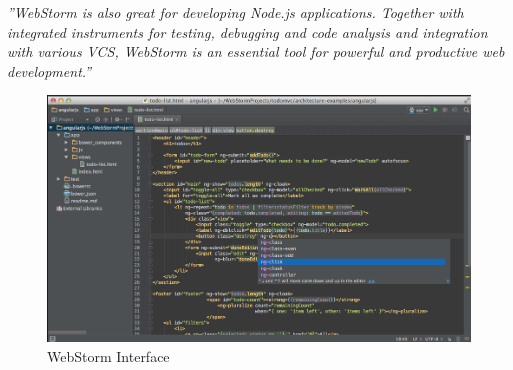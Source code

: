 \textit{''WebStorm is also great for developing Node.js applications. Together with integrated instruments 
for testing, debugging and code analysis and integration with various VCS, WebStorm is an essential tool for powerful and productive web development.''}\cite{webstorm}
\\

\begin{figure}[h]
\centering
\includegraphics[width=1\linewidth]{graphics/chapter3/1}
\caption{WebStorm Interface}
\end{figure}


